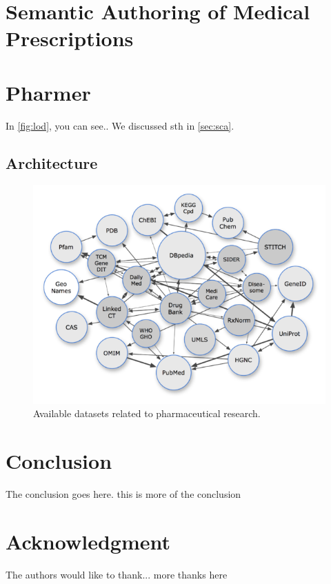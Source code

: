 \documentclass[10pt, conference, compsocconf]{IEEEtran}
\begin{document}
\section{Semantic Authoring of Medical Prescriptions}

\section{Pharmer}
In \autoref{fig:lod}, you can see..
We discussed sth in \autoref{sec:sca}.

\subsection{Architecture}

\begin{figure}[tb]
	\centering
		\includegraphics[width=1.0\columnwidth]{images/lod_cloud.png}
	\caption{Available datasets related to pharmaceutical research.}
	\label{fig:lod}
\end{figure}


\section{Conclusion}
The conclusion goes here. this is more of the conclusion



\section*{Acknowledgment}


The authors would like to thank...
more thanks here








\end{document}
